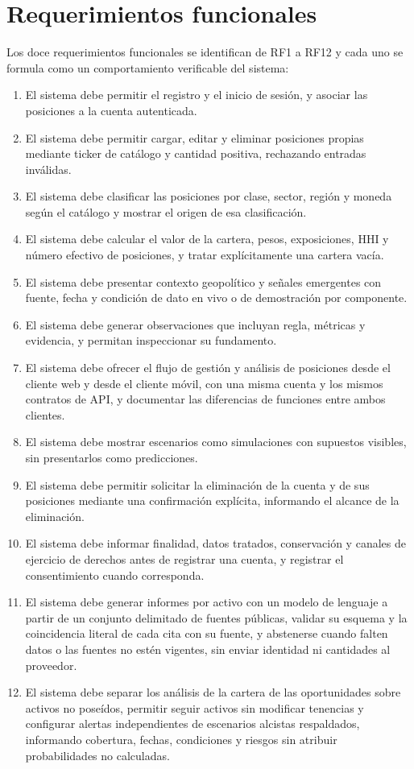 \section{Requerimientos funcionales}\label{sec:req-funcionales}

Los doce requerimientos funcionales se identifican de RF1 a RF12 y cada uno se formula como un comportamiento verificable del sistema:
\begin{enumerate}[label=RF\arabic*.,leftmargin=*]
\item El sistema debe permitir el registro y el inicio de sesión, y asociar las posiciones a la cuenta autenticada.
\item El sistema debe permitir cargar, editar y eliminar posiciones propias mediante ticker de catálogo y cantidad positiva, rechazando entradas inválidas.
\item El sistema debe clasificar las posiciones por clase, sector, región y moneda según el catálogo y mostrar el origen de esa clasificación.
\item El sistema debe calcular el valor de la cartera, pesos, exposiciones, HHI y número efectivo de posiciones, y tratar explícitamente una cartera vacía.
\item El sistema debe presentar contexto geopolítico y señales emergentes con fuente, fecha y condición de dato en vivo o de demostración por componente.
\item El sistema debe generar observaciones que incluyan regla, métricas y evidencia, y permitan inspeccionar su fundamento.
\item El sistema debe ofrecer el flujo de gestión y análisis de posiciones desde el cliente web y desde el cliente móvil, con una misma cuenta y los mismos contratos de API, y documentar las diferencias de funciones entre ambos clientes.
\item El sistema debe mostrar escenarios como simulaciones con supuestos visibles, sin presentarlos como predicciones.
\item El sistema debe permitir solicitar la eliminación de la cuenta y de sus posiciones mediante una confirmación explícita, informando el alcance de la eliminación.
\item El sistema debe informar finalidad, datos tratados, conservación y canales de ejercicio de derechos antes de registrar una cuenta, y registrar el consentimiento cuando corresponda.
\item El sistema debe generar informes por activo con un modelo de lenguaje a partir de un conjunto delimitado de fuentes públicas, validar su esquema y la coincidencia literal de cada cita con su fuente, y abstenerse cuando falten datos o las fuentes no estén vigentes, sin enviar identidad ni cantidades al proveedor.
\item El sistema debe separar los análisis de la cartera de las oportunidades sobre activos no poseídos, permitir seguir activos sin modificar tenencias y configurar alertas independientes de escenarios alcistas respaldados, informando cobertura, fechas, condiciones y riesgos sin atribuir probabilidades no calculadas.
\end{enumerate}

